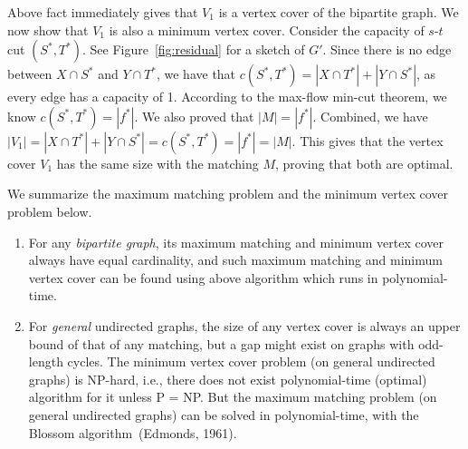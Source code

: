 Above fact immediately gives that $V_1$ is a vertex cover of the bipartite graph.
We now show that $V_1$ is also a minimum vertex cover.
Consider the capacity of $s$-$t$ cut $(S^*, T^*)$. 
See Figure~\ref{fig:residual} for a sketch of $G'$.
Since there is no edge between $X\cap S^*$ and $Y\cap T^*$, we have
that $c(S^*, T^*) = |X\cap T^*| + |Y\cap S^*|$, as every edge has a capacity of 1.
According to the max-flow min-cut theorem, we know 
$c(S^*, T^*) = |f^*|$. We also proved that $|M| = |f^*|$. Combined, 
we have $|V_1| = |X\cap T^*| + |Y\cap S^*| = c(S^*, T^*) = |f^*| = |M|$. 
This gives that the vertex cover $V_1$ has the same size with the matching $M$,
	 proving that both are optimal. 

We summarize the maximum matching problem and the minimum vertex cover problem below.
\begin{enumerate}
\item For any \emph{bipartite graph}, its maximum matching
and minimum vertex cover always have equal cardinality,
and such maximum matching and minimum vertex cover
can be found using above algorithm which runs in polynomial-time.
\item For \emph{general} undirected graphs, the size of
any vertex cover is always an upper bound of that of any matching,
but a gap might exist on graphs with odd-length cycles.
The minimum vertex cover problem (on general undirected graphs) is NP-hard, i.e., there does not
exist polynomial-time (optimal) algorithm for it unless P{} = {}NP.
But the maximum matching problem (on general undirected graphs) can be solved in polynomial-time,
 with the Blossom algorithm~(Edmonds, 1961).
\end{enumerate}

